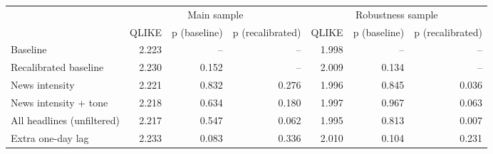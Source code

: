 \begin{tabular}{lrrrrrr}
\toprule
 & \multicolumn{3}{c}{Main sample} & \multicolumn{3}{c}{Robustness sample} \\
 & QLIKE & p (baseline) & p (recalibrated) & QLIKE & p (baseline) & p (recalibrated) \\
\midrule
Baseline & 2.223 & -- & -- & 1.998 & -- & -- \\
Recalibrated baseline & 2.230 & 0.152 & -- & 2.009 & 0.134 & -- \\
News intensity & 2.221 & 0.832 & 0.276 & 1.996 & 0.845 & 0.036 \\
News intensity + tone & 2.218 & 0.634 & 0.180 & 1.997 & 0.967 & 0.063 \\
All headlines (unfiltered) & 2.217 & 0.547 & 0.062 & 1.995 & 0.813 & 0.007 \\
Extra one-day lag & 2.233 & 0.083 & 0.336 & 2.010 & 0.104 & 0.231 \\
\bottomrule
\end{tabular}
